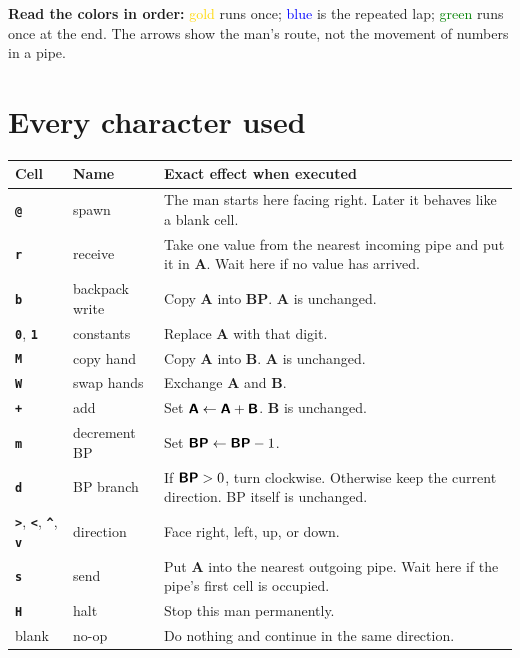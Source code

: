 \documentclass[11pt,a4paper]{article}
\newcommand{\op}[1]{\texttt{\bfseries #1}}
\newcommand{\reg}[1]{\textsf{\bfseries #1}}
\begin{document}
\begin{plainbox}
  \textbf{Read the colors in order:}
  \textcolor{gold}{gold} runs once;
  \textcolor{blue}{blue} is the repeated lap;
  \textcolor{green}{green} runs once at the end.
  The arrows show the man's route, not the movement of numbers in a pipe.
\end{plainbox}

\clearpage
\section{Every character used}

\begin{center}
\begin{tabularx}{\textwidth}{>{\centering\arraybackslash}p{1.2cm}
                             >{\raggedright\arraybackslash}p{3.2cm}
                             X}
  \toprule
  \textbf{Cell} & \textbf{Name} & \textbf{Exact effect when executed}\\
  \midrule
  \op{@} & spawn & The man starts here facing right. Later it behaves like
                    a blank cell.\\
  \op{r} & receive & Take one value from the nearest incoming pipe and put it
                     in \reg{A}. Wait here if no value has arrived.\\
  \op{b} & backpack write & Copy \reg{A} into \reg{BP}. \reg{A} is unchanged.\\
  \op{0}, \op{1} & constants & Replace \reg{A} with that digit.\\
  \op{M} & copy hand & Copy \reg{A} into \reg{B}. \reg{A} is unchanged.\\
  \op{W} & swap hands & Exchange \reg{A} and \reg{B}.\\
  \op{+} & add & Set \(\reg{A}\leftarrow\reg{A}+\reg{B}\).
                 \reg{B} is unchanged.\\
  \op{m} & decrement BP & Set \(\reg{BP}\leftarrow\reg{BP}-1\).\\
  \op{d} & BP branch & If \(\reg{BP}>0\), turn clockwise. Otherwise keep the
                       current direction. BP itself is unchanged.\\
  \op{>}, \op{<}, \op{\string^}, \op{v} & direction & Face right, left, up,
                       or down.\\
  \op{s} & send & Put \reg{A} into the nearest outgoing pipe. Wait here if
                  the pipe's first cell is occupied.\\
  \op{H} & halt & Stop this man permanently.\\
  blank & no-op & Do nothing and continue in the same direction.\\
  \bottomrule
\end{tabularx}
\end{center}
\end{document}
